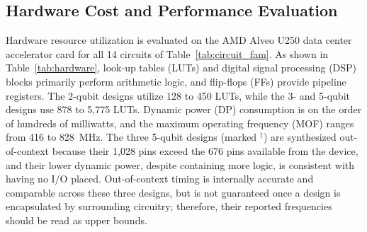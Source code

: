 \documentclass[conference]{IEEEtran}
\begin{document}

\subsection{Hardware Cost and Performance Evaluation}
\label{subsec:hardware}

%
Hardware resource utilization is evaluated on the AMD Alveo U250 data center accelerator card for all 14 circuits of Table~\ref{tab:circuit_fam}. As shown in Table~\ref{tab:hardware}, look-up tables (LUTs) and digital signal processing (DSP) blocks primarily perform arithmetic logic, and flip-flops (FFs) provide pipeline registers. The 2-qubit designs utilize 128 to 450 LUTs, while the 3- and 5-qubit designs use 878 to 5,775 LUTs. Dynamic power (DP) consumption is on the order of hundreds of milliwatts, and the maximum operating frequency (MOF) ranges from 416 to 828~MHz. The three 5-qubit designs (marked $^\dag$) are synthesized out-of-context because their 1,028 pins exceed the 676 pins available from the device, and their lower dynamic power, despite containing more logic, is consistent with having no I/O placed. Out-of-context timing is internally accurate and comparable across these three designs, but is not guaranteed once a design is encapsulated by surrounding circuitry; therefore, their reported frequencies should be read as upper bounds.

\end{document}
